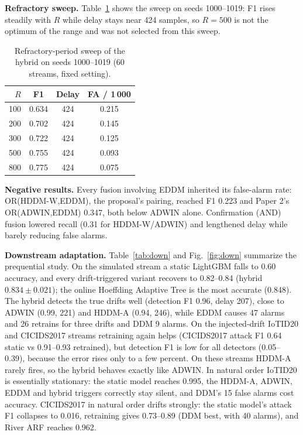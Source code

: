 \documentclass[conference]{IEEEtran}
\begin{document}
\textbf{Refractory sweep.} Table~\ref{tab:sweep} shows the sweep on seeds 1000--1019: F1 rises steadily with $R$ while delay stays near 424 samples, so $R=500$ is not the optimum of the range and was not selected from this sweep.

\begin{table}[t]
\caption{Refractory-period sweep of the hybrid on seeds 1000--1019 (60 streams, fixed setting).}
\label{tab:sweep}
\centering\small
\begin{tabular}{@{}rccc@{}}
\toprule
$R$ & F1 & Delay & FA / 1\,000\\
\midrule
100 & 0.634 & 424 & 0.215\\
200 & 0.702 & 424 & 0.145\\
300 & 0.722 & 424 & 0.125\\
500 & 0.755 & 424 & 0.093\\
800 & 0.775 & 424 & 0.075\\
\bottomrule
\end{tabular}
\end{table}

\textbf{Negative results.} Every fusion involving EDDM inherited its false-alarm rate: OR(HDDM-W,EDDM), the proposal's pairing, reached F1 0.223 and Paper 2's OR(ADWIN,EDDM) 0.347, both below ADWIN alone. Confirmation (AND) fusion lowered recall (0.31 for HDDM-W/ADWIN) and lengthened delay while barely reducing false alarms.

\textbf{Downstream adaptation.} Table~\ref{tab:down} and Fig.~\ref{fig:down} summarize the prequential study. On the simulated stream a static LightGBM falls to 0.60 accuracy, and every drift-triggered variant recovers to 0.82--0.84 (hybrid $0.834\pm0.021$); the online Hoeffding Adaptive Tree is the most accurate (0.848). The hybrid detects the true drifts well (detection F1 0.96, delay 207), close to ADWIN (0.99, 221) and HDDM-A (0.94, 246), while EDDM causes 47 alarms and 26 retrains for three drifts and DDM 9 alarms. On the injected-drift IoTID20 and CICIDS2017 streams retraining again helps (CICIDS2017 attack F1 0.64 static vs 0.91--0.93 retrained), but detection F1 is low for all detectors (0.05--0.39), because the error rises only to a few percent. On these streams HDDM-A rarely fires, so the hybrid behaves exactly like ADWIN. In natural order IoTID20 is essentially stationary: the static model reaches 0.995, the HDDM-A, ADWIN, EDDM and hybrid triggers correctly stay silent, and DDM's 15 false alarms cost accuracy. CICIDS2017 in natural order drifts strongly: the static model's attack F1 collapses to 0.016, retraining gives 0.73--0.89 (DDM best, with 40 alarms), and River ARF reaches 0.962.
\end{document}
